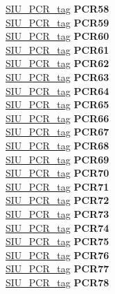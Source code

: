 \begin{DoxyCompactItemize}
\begin{tabbing}
\>\>\mbox{\hyperlink{unionSIU__tag_1_1SIU__PCR__tag}{SIU\_PCR\_tag}} {\bfseries PCR58}\\
\>\>\mbox{\hyperlink{unionSIU__tag_1_1SIU__PCR__tag}{SIU\_PCR\_tag}} {\bfseries PCR59}\\
\>\>\mbox{\hyperlink{unionSIU__tag_1_1SIU__PCR__tag}{SIU\_PCR\_tag}} {\bfseries PCR60}\\
\>\>\mbox{\hyperlink{unionSIU__tag_1_1SIU__PCR__tag}{SIU\_PCR\_tag}} {\bfseries PCR61}\\
\>\>\mbox{\hyperlink{unionSIU__tag_1_1SIU__PCR__tag}{SIU\_PCR\_tag}} {\bfseries PCR62}\\
\>\>\mbox{\hyperlink{unionSIU__tag_1_1SIU__PCR__tag}{SIU\_PCR\_tag}} {\bfseries PCR63}\\
\>\>\mbox{\hyperlink{unionSIU__tag_1_1SIU__PCR__tag}{SIU\_PCR\_tag}} {\bfseries PCR64}\\
\>\>\mbox{\hyperlink{unionSIU__tag_1_1SIU__PCR__tag}{SIU\_PCR\_tag}} {\bfseries PCR65}\\
\>\>\mbox{\hyperlink{unionSIU__tag_1_1SIU__PCR__tag}{SIU\_PCR\_tag}} {\bfseries PCR66}\\
\>\>\mbox{\hyperlink{unionSIU__tag_1_1SIU__PCR__tag}{SIU\_PCR\_tag}} {\bfseries PCR67}\\
\>\>\mbox{\hyperlink{unionSIU__tag_1_1SIU__PCR__tag}{SIU\_PCR\_tag}} {\bfseries PCR68}\\
\>\>\mbox{\hyperlink{unionSIU__tag_1_1SIU__PCR__tag}{SIU\_PCR\_tag}} {\bfseries PCR69}\\
\>\>\mbox{\hyperlink{unionSIU__tag_1_1SIU__PCR__tag}{SIU\_PCR\_tag}} {\bfseries PCR70}\\
\>\>\mbox{\hyperlink{unionSIU__tag_1_1SIU__PCR__tag}{SIU\_PCR\_tag}} {\bfseries PCR71}\\
\>\>\mbox{\hyperlink{unionSIU__tag_1_1SIU__PCR__tag}{SIU\_PCR\_tag}} {\bfseries PCR72}\\
\>\>\mbox{\hyperlink{unionSIU__tag_1_1SIU__PCR__tag}{SIU\_PCR\_tag}} {\bfseries PCR73}\\
\>\>\mbox{\hyperlink{unionSIU__tag_1_1SIU__PCR__tag}{SIU\_PCR\_tag}} {\bfseries PCR74}\\
\>\>\mbox{\hyperlink{unionSIU__tag_1_1SIU__PCR__tag}{SIU\_PCR\_tag}} {\bfseries PCR75}\\
\>\>\mbox{\hyperlink{unionSIU__tag_1_1SIU__PCR__tag}{SIU\_PCR\_tag}} {\bfseries PCR76}\\
\>\>\mbox{\hyperlink{unionSIU__tag_1_1SIU__PCR__tag}{SIU\_PCR\_tag}} {\bfseries PCR77}\\
\>\>\mbox{\hyperlink{unionSIU__tag_1_1SIU__PCR__tag}{SIU\_PCR\_tag}} {\bfseries PCR78}\\

\end{tabbing}
\end{DoxyCompactItemize}
